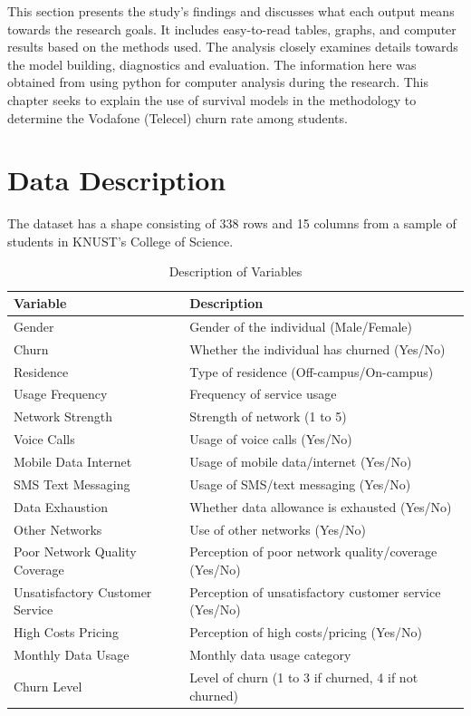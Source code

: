 \documentclass[doublespacing]{report} %
\begin{document}
This section presents the study's findings and discusses what each output means towards the research goals. It includes easy-to-read tables, graphs, and computer results based on the methods used. The analysis closely examines details towards the model building, diagnostics and evaluation. The information here was obtained from using python for computer analysis during the research. This chapter seeks to explain the use of survival models in the methodology to determine the Vodafone (Telecel) churn rate among students.

\section{Data Description}

The dataset has a shape consisting of 338 rows and 15 columns from a sample of students  in KNUST's College of Science.

\begin{table}[H]
    \centering
    \begin{tabular}{ll}
        \toprule
        Variable & Description \\
        \midrule
        Gender & Gender of the individual (Male/Female) \\
        Churn & Whether the individual has churned (Yes/No) \\
        Residence & Type of residence (Off-campus/On-campus) \\
        Usage Frequency & Frequency of service usage  \\
        Network Strength & Strength of network (1 to 5) \\
        Voice Calls & Usage of voice calls (Yes/No) \\
        Mobile Data Internet & Usage of mobile data/internet (Yes/No) \\
        SMS Text Messaging & Usage of SMS/text messaging (Yes/No) \\
        Data Exhaustion & Whether data allowance is exhausted (Yes/No) \\
        Other Networks & Use of other networks (Yes/No) \\
        Poor Network Quality Coverage & Perception of poor network quality/coverage (Yes/No) \\
        Unsatisfactory Customer Service & Perception of unsatisfactory customer service (Yes/No) \\
        High Costs Pricing & Perception of high costs/pricing (Yes/No) \\
        Monthly Data Usage & Monthly data usage category  \\
        Churn Level & Level of churn (1 to 3 if churned, 4 if not churned) \\
        \bottomrule
    \end{tabular}
    \caption{Description of Variables}
\end{table}
\end{document}
